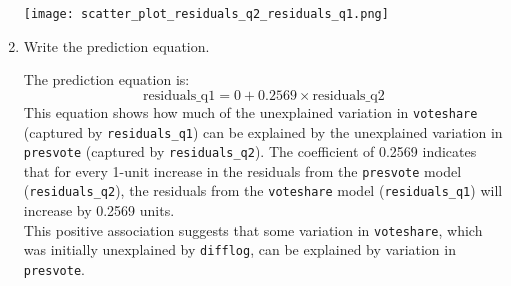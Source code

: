\documentclass[12pt,letterpaper]{article}
\begin{document}
\begin{enumerate}
		
		
		\texttt{[image: scatter\_plot\_residuals\_q2\_residuals\_q1.png]}
		
		
		\vspace{6cm}
		\item Write the prediction equation.
		
		The prediction equation is:
		\[
		\text{residuals\_q1} = 0 + 0.2569 \times \text{residuals\_q2}
		\]
		This equation shows how much of the unexplained variation in \texttt{voteshare} (captured by \texttt{residuals\_q1}) can be explained by the unexplained variation in \texttt{presvote} (captured by \texttt{residuals\_q2}). The coefficient of 0.2569 indicates that for every 1-unit increase in the residuals from the \texttt{presvote} model (\texttt{residuals\_q2}), the residuals from the \texttt{voteshare} model (\texttt{residuals\_q1}) will increase by 0.2569 units. \\
		This positive association suggests that some variation in \texttt{voteshare}, which was initially unexplained by \texttt{difflog}, can be explained by variation in \texttt{presvote}.
		
		
	\end{enumerate}
	
	\newpage	
\end{document}
